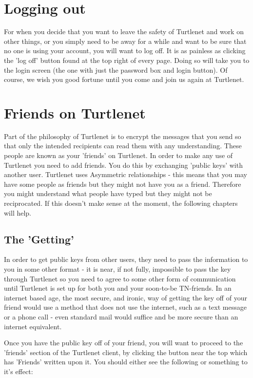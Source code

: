 \section{Logging out}
For when you decide that you want to leave the safety of Turtlenet and work on
other things, or you simply need to be away for a while and want to be sure that
no one is using your account, you will want to log off.  It is as painless as
clicking the 'log off' button found at the top right of every page.  Doing so
will take you to the login screen (the one with just the password box and login
button).  Of course, we wish you good fortune until you come and join us again
at Turtlenet.

\section{Friends on Turtlenet}
Part of the philosophy of Turtlenet is to encrypt the messages that you send so
that only the intended recipients can read them with any understanding.  These
people are known as your 'friends' on Turtlenet.  In order to make any use of
Turtlenet you need to add friends.  You do this by exchanging 'public keys' with
another user.  Turtlenet uses Asymmetric relationships - this means that you may
have some people as friends but they might not have you as a friend.  Therefore
you might understand what people have typed but they might not be reciprocated.
If this doesn't make sense at the moment, the following chapters will help.

\subsection{The 'Getting'}
In order to get public keys from other users, they need to pass the information
to you in some other format - it is near, if not fully, impossible to pass the
key through Turtlenet so you need to agree to some other form of communication
until Turtlenet is set up for both you and your soon-to-be TN-friends.  In an
internet based age, the most secure, and ironic, way of getting the key off of
your friend would use a method that does not use the internet, such as a text
message or a phone call - even standard mail would suffice and be more secure
than an internet equivalent.

Once you have the public key off of your friend, you will want to proceed to the
'friends' section of the Turtlenet client, by clicking the button near the top
which has 'Friends' written upon it.  You should either see the following or
something to it's effect:

